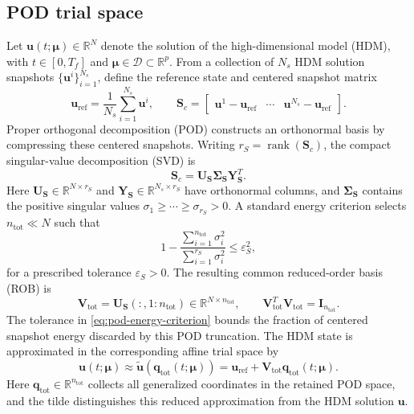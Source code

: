 \documentclass[11pt]{article}
\newcommand{\qtot}{\mathbf q_{\mathrm{tot}}}
\newcommand{\uvec}{\mathbf u}
\newcommand{\utilde}{\widetilde{\mathbf u}}
\newcommand{\mub}{\bm\mu}
\begin{document}
\subsection{POD trial space}
Let $\uvec(t;\mub)\in\mathbb R^N$ denote the solution of the
high-dimensional model (HDM), with
$t\in[0,T_f]$ and $\mub\in\mathcal D\subset\mathbb R^p$.
From a collection of $N_s$ HDM
solution snapshots $\{\uvec^i\}_{i=1}^{N_s}$, define the reference state and
centered snapshot matrix
\begin{equation}
\uvec_{\mathrm{ref}}=\frac{1}{N_s}\sum_{i=1}^{N_s}\uvec^i,
\qquad
\mathbf S_c=
\begin{bmatrix}
\uvec^1-\uvec_{\mathrm{ref}} & \cdots &
\uvec^{N_s}-\uvec_{\mathrm{ref}}
\end{bmatrix}.
\label{eq:centered-snapshots}
\end{equation}
Proper orthogonal decomposition (POD) constructs an orthonormal basis by
compressing these centered snapshots.  Writing
$r_S=\operatorname{rank}(\mathbf S_c)$, the compact
singular-value decomposition (SVD) is
\begin{equation}
\mathbf S_c=\mathbf U_{\mathbf S}\boldsymbol\Sigma_{\mathbf S}
\mathbf Y_{\mathbf S}^T.
\label{eq:snapshot-svd}
\end{equation}
Here $\mathbf U_{\mathbf S}\in\mathbb R^{N\times r_S}$ and
$\mathbf Y_{\mathbf S}\in\mathbb R^{N_s\times r_S}$ have orthonormal
columns, and $\boldsymbol\Sigma_{\mathbf S}$ contains the positive singular
values $\sigma_1\geq\cdots\geq\sigma_{r_S}>0$.  A
standard energy criterion selects $n_{\mathrm{tot}}\ll N$ such that
\begin{equation}
1-\frac{\displaystyle\sum_{i=1}^{n_{\mathrm{tot}}}\sigma_i^2}
{\displaystyle\sum_{i=1}^{r_S}\sigma_i^2}
\leq\varepsilon_S^2,
\label{eq:pod-energy-criterion}
\end{equation}
for a prescribed tolerance $\varepsilon_S>0$.  The resulting common
reduced-order basis (ROB) is
\begin{equation}
\mathbf V_{\mathrm{tot}}=
\mathbf U_{\mathbf S}(:,1:n_{\mathrm{tot}})
\in\mathbb R^{N\times n_{\mathrm{tot}}},
\qquad
\mathbf V_{\mathrm{tot}}^T\mathbf V_{\mathrm{tot}}=\mathbf I_{n_{\mathrm{tot}}}.
\label{eq:pod-basis}
\end{equation}
The tolerance in \eqref{eq:pod-energy-criterion} bounds the fraction of
centered snapshot energy discarded by this POD truncation.
The HDM state is approximated in the corresponding affine trial space by
\begin{equation}
\uvec(t;\mub)\approx
\utilde(\qtot(t;\mub))
=\uvec_{\mathrm{ref}}+\mathbf V_{\mathrm{tot}}\qtot(t;\mub).
\label{eq:linear-reconstruction}
\end{equation}
Here $\qtot\in\mathbb R^{n_{\mathrm{tot}}}$ collects all generalized
coordinates in the retained POD space, and the tilde distinguishes this
reduced approximation from the HDM solution $\uvec$.
\end{document}
